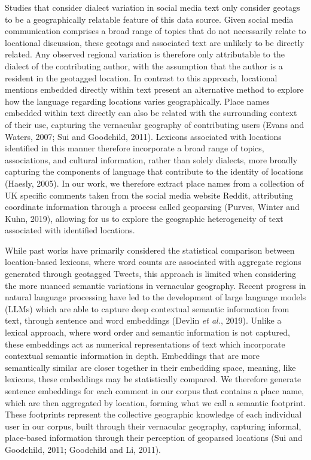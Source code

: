 \documentclass[
]{article}
\begin{document}
Studies that consider dialect variation in social media text only
consider geotags to be a geographically relatable feature of this data
source. Given social media communication comprises a broad range of
topics that do not necessarily relate to locational discussion, these
geotags and associated text are unlikely to be directly related. Any
observed regional variation is therefore only attributable to the
dialect of the contributing author, with the assumption that the author
is a resident in the geotagged location. In contrast to this approach,
locational mentions embedded directly within text present an alternative
method to explore how the language regarding locations varies
geographically. Place names embedded within text directly can also be
related with the surrounding context of their use, capturing the
vernacular geography of contributing users (Evans and Waters, 2007; Sui
and Goodchild, 2011). Lexicons associated with locations identified in
this manner therefore incorporate a broad range of topics, associations,
and cultural information, rather than solely dialects, more broadly
capturing the components of language that contribute to the identity of
locations (Haesly, 2005). In our work, we therefore extract place names
from a collection of UK specific comments taken from the social media
website Reddit, attributing coordinate information through a process
called geoparsing (Purves, Winter and Kuhn, 2019), allowing for us to
explore the geographic heterogeneity of text associated with identified
locations.

While past works have primarily considered the statistical comparison
between location-based lexicons, where word counts are associated with
aggregate regions generated through geotagged Tweets, this approach is
limited when considering the more nuanced semantic variations in
vernacular geography. Recent progress in natural language processing
have led to the development of large language models (LLMs) which are
able to capture deep contextual semantic information from text, through
sentence and word embeddings (Devlin \emph{et al.}, 2019). Unlike a
lexical approach, where word order and semantic information is not
captured, these embeddings act as numerical representations of text
which incorporate contextual semantic information in depth. Embeddings
that are more semantically similar are closer together in their
embedding space, meaning, like lexicons, these embeddings may be
statistically compared. We therefore generate sentence embeddings for
each comment in our corpus that contains a place name, which are then
aggregated by location, forming what we call a semantic footprint. These
footprints represent the collective geographic knowledge of each
individual user in our corpus, built through their vernacular geography,
capturing informal, place-based information through their perception of
geoparsed locations (Sui and Goodchild, 2011; Goodchild and Li, 2011).
\end{document}
